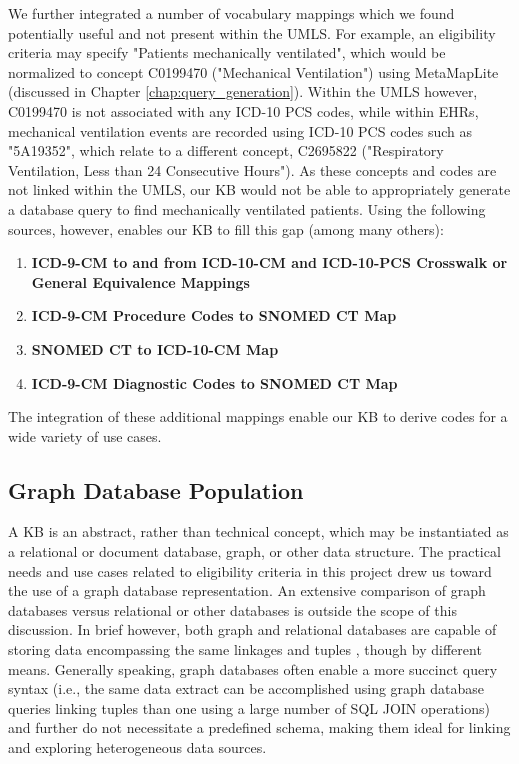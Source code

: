 \documentclass[../main.tex]{subfiles}
\begin{document}
We further integrated a number of vocabulary mappings which we found potentially useful and not present within the UMLS. For example, an eligibility criteria may specify "Patients mechanically ventilated", which would be normalized to concept C0199470 ("Mechanical Ventilation") using MetaMapLite (discussed in Chapter \ref{chap:query_generation}). Within the UMLS however, C0199470 is not associated with any ICD-10 PCS codes, while within EHRs, mechanical ventilation events are recorded using ICD-10 PCS codes such as "5A19352", which relate to a different concept, C2695822 ("Respiratory Ventilation, Less than 24 Consecutive Hours"). As these concepts and codes are not linked within the UMLS, our KB would not be able to appropriately generate a database query to find mechanically ventilated patients. Using the following sources, however, enables our KB to fill this gap (among many others):

\begin{enumerate}
    \item \textbf{ICD-9-CM to and from ICD-10-CM and ICD-10-PCS Crosswalk or General Equivalence Mappings} \cite{icd9_icd10_icd10pcs}
    \item \textbf{ICD-9-CM Procedure Codes to SNOMED CT Map} \cite{icd9proc_snomed}
    \item \textbf{SNOMED CT to ICD-10-CM Map} \cite{snomed_icd10}
    \item \textbf{ICD-9-CM Diagnostic Codes to SNOMED CT Map} \cite{icd9dx_snomed}
\end{enumerate}

The integration of these additional mappings enable our KB to derive codes for a wide variety of use cases.

\subsection{Graph Database Population}

A KB is an abstract, rather than technical concept, which may be instantiated as a relational or document database, graph, or other data structure. The practical needs and use cases related to eligibility criteria in this project drew us toward the use of a graph database representation. An extensive comparison of graph databases versus relational or other databases is outside the scope of this discussion. In brief however, both graph and relational databases are capable of storing data encompassing the same linkages and tuples \cite{priyatna2014formalisation}, though by different means. Generally speaking, graph databases often enable a more succinct query syntax (i.e., the same data extract can be accomplished using graph database queries linking tuples than one using a large number of SQL JOIN operations) and further do not necessitate a predefined schema, making them ideal for linking and exploring heterogeneous data sources.
\end{document}
